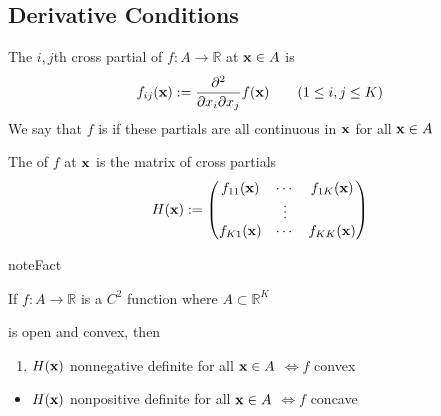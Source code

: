 \documentclass[letterpaper,10pt,english]{jupyterBook}
\begin{document}
\subsection{Derivative Conditions}
\label{\detokenize{06.optimization_fundamentals:derivative-conditions}}
\sphinxAtStartPar
The \(i,j\)\sphinxhyphen{}th cross partial of \(f \colon A \to \mathbb{R}\) at \({\bf x} \in A\) is
\begin{equation*}
\begin{split}
%
f_{ij}({\bf x})
:= \frac{\partial^2}{\partial x_i \partial x_j} 
f({\bf x})
\qquad (1 \leq i, j \leq K)
%
\end{split}
\end{equation*}
\sphinxAtStartPar
We say that \(f\) is  if these partials are all
continuous in \({\bf x}\) for all \({\bf x} \in A\)

\sphinxAtStartPar
The  of \(f\) at \({\bf x}\) is the matrix of cross
partials
\begin{equation*}
\begin{split}
%
H({\bf x})
:=
\begin{pmatrix}
f_{11}({\bf x}) & \cdots & f_{1K}({\bf x}) \\
& \vdots & \\
f_{K1}({\bf x}) & \cdots & f_{KK}({\bf x}) 
\end{pmatrix}
%
\end{split}
\end{equation*}
\begin{sphinxadmonition}{note}{Fact}

\sphinxAtStartPar
If \(f \colon A \to \mathbb{R}\) is a \(C^2\) function where \(A \subset \mathbb{R}^K\)
\end{sphinxadmonition}

\sphinxAtStartPar
is open and convex, then
\begin{enumerate}
%
\item {} 
\sphinxAtStartPar
\(H({\bf x})\) nonnegative definite for all \({\bf x} \in A\)
\(\iff f\) convex

\end{enumerate}
\begin{itemize}
\item {} 
\sphinxAtStartPar
\(H({\bf x})\) nonpositive definite for all \({\bf x} \in A\)
\(\iff f\) concave

\end{itemize}
\end{document}
